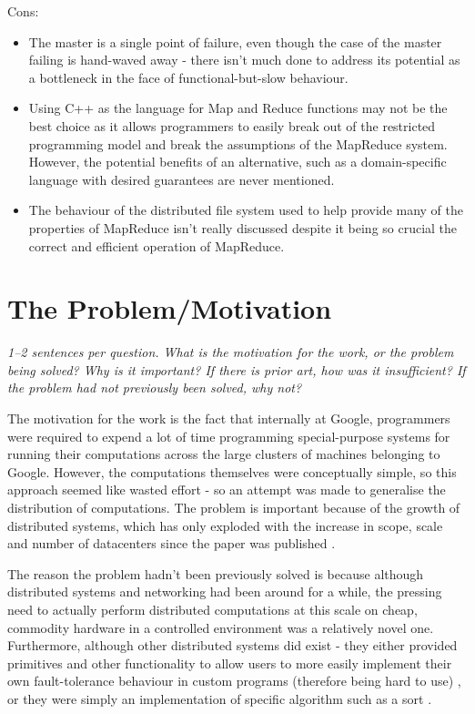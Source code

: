 \documentclass[11pt]{article}
\begin{document}
Cons:

\begin{itemize}

    \item The master is a single point of failure, even though the case of the
    master failing is hand-waved away - there isn't much done to address its
    potential as a bottleneck in the face of functional-but-slow behaviour.

    \item Using C++ as the language for Map and Reduce functions may not be the
    best choice as it allows programmers to easily break out of the restricted
    programming model and break the assumptions of the MapReduce system.
    However, the potential benefits of an alternative, such as a
    domain-specific language with desired guarantees are never mentioned.

    \item The behaviour of the distributed file system used to help provide
    many of the properties of MapReduce isn't really discussed despite it being
    so crucial the correct and efficient operation of MapReduce.

\end{itemize}

\section*{The Problem/Motivation}

\textsl{1--2 sentences per question. What is the motivation for the work, or
the problem being solved? Why is it important? If there is prior art, how was
it insufficient? If the problem had not previously been solved, why not?}

The motivation for the work is the fact that internally at Google, programmers
were required to expend a lot of time programming special-purpose systems for
running their computations across the large clusters of machines belonging to
Google. However, the computations themselves were conceptually simple, so this
approach seemed like wasted effort - so an attempt was made to generalise the
distribution of computations. The problem is important because of the growth of
distributed systems, which has only exploded with the increase in scope, scale
and number of datacenters since the paper was published
\cite{VirtualizationGrowth}.

The reason the problem hadn't been previously solved is because although
distributed systems and networking had been around for a while, the pressing
need to actually perform distributed computations at this scale on cheap,
commodity hardware in a controlled environment was a relatively novel one.
Furthermore, although other distributed systems did exist - they either
provided primitives and other functionality to allow users to more easily
implement their own fault-tolerance behaviour in custom programs (therefore
being hard to use) \cite{River} \cite{MPI}
\cite{BridgingModelForParallelComputation}, or they were simply an
implementation of specific algorithm such as a sort \cite{NowSort}.
\end{document}
